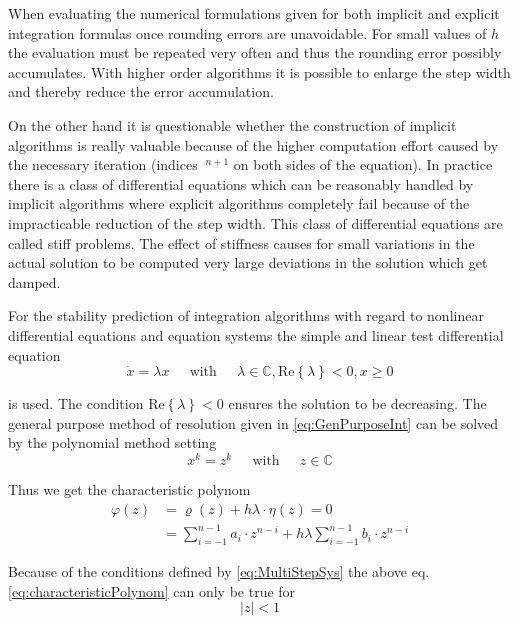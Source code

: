 \documentclass[10pt]{report}
\begin{document}
When evaluating the numerical formulations given for both implicit and
explicit integration formulas once rounding errors are unavoidable.
For small values of $h$ the evaluation must be repeated very often and
thus the rounding error possibly accumulates.  With higher order
algorithms it is possible to enlarge the step width and thereby reduce
the error accumulation.

\addvspace{12pt}

On the other hand it is questionable whether the construction of
implicit algorithms is really valuable because of the higher
computation effort caused by the necessary iteration (indices
$~^{n+1}$ on both sides of the equation).  In practice there is a class
of differential equations which can be reasonably handled by implicit
algorithms where explicit algorithms completely fail because of the
impracticable reduction of the step width.  This class of differential
equations are called stiff problems.  The effect of stiffness causes
for small variations in the actual solution to be computed very large
deviations in the solution which get damped.

\addvspace{12pt}

For the stability prediction of integration algorithms with regard to
nonlinear differential equations and equation systems the simple and
linear test differential equation
\begin{equation}
\dot{x} = \lambda x
\;\;\;\; \textrm{ with } \;\;\;\;
\lambda \in \mathbb{C}, \text{Re}\left\{\lambda\right\} < 0, x \ge 0
\end{equation}

is used.  The condition $\text{Re}\left\{\lambda\right\} < 0$ ensures
the solution to be decreasing.  The general purpose method of
resolution given in \eqref{eq:GenPurposeInt} can be solved by the
polynomial method setting
\begin{equation}
x^k = z^k
\;\;\;\; \textrm{ with } \;\;\;\;
z \in \mathbb{C}
\end{equation}

Thus we get the characteristic polynom
\begin{align}
\label{eq:characteristicPolynom}
\varphi\left(z\right) &= \varrho\left(z\right) + h\lambda \cdot \eta\left(z\right) = 0\\
&= \sum^{n-1}_{i=-1} a_i\cdot z^{n-i} + h\lambda \sum^{n-1}_{i=-1} b_i\cdot z^{n-i}
\end{align}

Because of the conditions defined by \eqref{eq:MultiStepSys} the above
eq. \eqref{eq:characteristicPolynom} can only be true for
\begin{equation}
\left|z\right| < 1
\end{equation}
\end{document}
